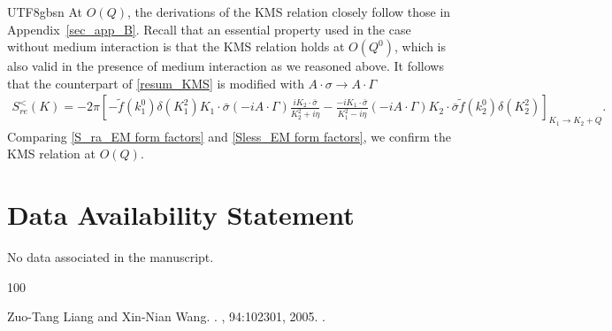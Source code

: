 \documentclass[11pt]{article}\def\baselinestretch{1.4}
\def\d{{\delta}}
\def\G{{\Gamma}}
\def\p{{\pi}}
\def\m{{\mu}}
\def\s{{\sigma}}
\newcommand{\pd}{{\partial}}
\begin{document}
\begin{CJK}{UTF8}{gbsn}
At $O(Q)$, the derivations of the KMS relation closely follow those in Appendix~\ref{sec_app_B}. Recall that an essential property used in the case without medium interaction is that the KMS relation holds at $O(Q^0)$, which is also valid in the presence of medium interaction as we reasoned above. It follows that the counterpart of \eqref{resum_KMS} is modified with $A\cdot\s\to A\cdot\G$
\begin{align}\label{Sless_EM form factors}
S^<_{re}(K)
=-2\p\left[-\tilde{f}(k_1^0)\d(K_1^2)K_1\cdot\bar{\s}(-iA\cdot \G )\frac{iK_2\cdot \bar{\sigma }}{K_2^2+i \eta }-\frac{-iK_1\cdot \bar{\sigma }}{K_1^2-i \eta }(-iA\cdot \G )K_2\cdot\bar{\s}\tilde{f}(k_2^0)\d(K_2^2)\right]_{K_1\to K_2+Q}.
\end{align}
Comparing \eqref{S_ra_EM form factors} and \eqref{Sless_EM form factors}, we confirm the KMS relation at $O(Q)$.






\section{Data Availability Statement}
No data associated in the manuscript.




\begin{thebibliography}{100}

	 Zuo-Tang Liang and Xin-Nian Wang.
	.
	, 94:102301, 2005.
	.


\end{thebibliography}
\end{CJK}
\end{document}

